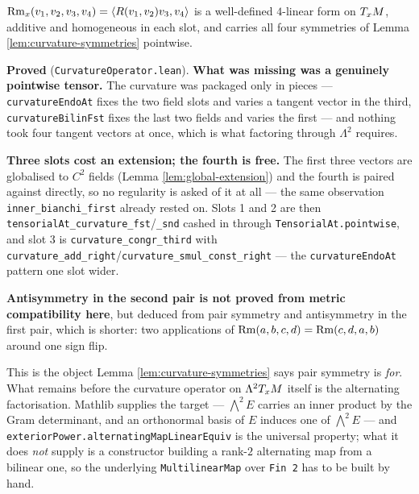 \begin{lemma}
  \label{lem:curvature-tensor-at}
  \leanok
  $\operatorname{Rm}_x(v_1,v_2,v_3,v_4) = \langle R(v_1,v_2)v_3, v_4\rangle$ is a well-defined
  $4$-linear form on $T_xM$, additive and homogeneous in each slot, and carries all four
  symmetries of Lemma \ref{lem:curvature-symmetries} pointwise.

  \textbf{Proved} (\texttt{CurvatureOperator.lean}). \textbf{What was missing was a genuinely
  pointwise tensor.} The curvature was packaged only in pieces --- \texttt{curvatureEndoAt}
  fixes the two field slots and varies a tangent vector in the third,
  \texttt{curvatureBilinFst} fixes the last two fields and varies the first --- and nothing
  took four tangent vectors at once, which is what factoring through $\Lambda^2$ requires.

  \textbf{Three slots cost an extension; the fourth is free.} The first three vectors are
  globalised to $C^2$ fields (Lemma \ref{lem:global-extension}) and the fourth is paired
  against directly, so no regularity is asked of it at all --- the same observation
  \texttt{inner\_bianchi\_first} already rested on. Slots 1 and 2 are then
  \texttt{tensorialAt\_curvature\_fst}/\texttt{\_snd} cashed in through
  \texttt{TensorialAt.pointwise}, and slot 3 is \texttt{curvature\_congr\_third} with
  \texttt{curvature\_add\_right}/\texttt{curvature\_smul\_const\_right} --- the
  \texttt{curvatureEndoAt} pattern one slot wider.

  \textbf{Antisymmetry in the second pair is not proved from metric compatibility here}, but
  deduced from pair symmetry and antisymmetry in the first pair, which is shorter: two
  applications of $\operatorname{Rm}(a,b,c,d) = \operatorname{Rm}(c,d,a,b)$ around one sign flip.

  This is the object Lemma \ref{lem:curvature-symmetries} says pair symmetry is \emph{for}.
  What remains before the curvature operator on $\Lambda^2 T_xM$ itself is the alternating
  factorisation. Mathlib supplies the target --- $\bigwedge^2 E$ carries an inner product by
  the Gram determinant, and an orthonormal basis of $E$ induces one of $\bigwedge^2 E$ --- and
  \texttt{exteriorPower.alternatingMapLinearEquiv} is the universal property; what it does
  \emph{not} supply is a constructor building a rank-$2$ alternating map from a bilinear one,
  so the underlying \texttt{MultilinearMap} over \texttt{Fin 2} has to be built by hand.
\end{lemma}

